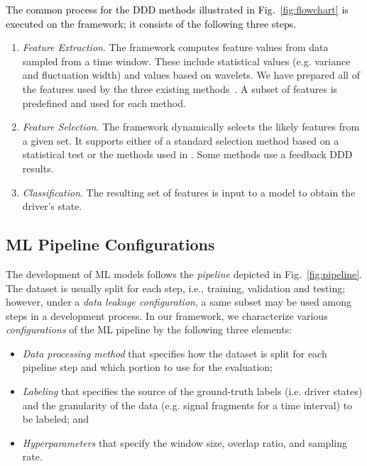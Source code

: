 \documentclass[letterpaper, 10 pt, conference]{ieeeconf}  %
\newcommand{\Ishii}[1]{\textcolor{black}{#1}}
\begin{document}
\Ishii{The common process for the DDD methods illustrated in Fig.~\ref{fig:flowchart} is executed on the framework; it consists of the following three steps.}
\begin{enumerate}
    \item \emph{Feature Extraction}. 
    The framework computes feature values from data sampled from a time window. These include statistical values (e.g. variance and fluctuation width) and values based on wavelets. We have prepared all of the features used by the three existing methods~\cite{Zhao2009, Arefnezhad2019, Wang2022}.
    A subset of features is predefined and used for each method.
    \item \emph{Feature Selection}. 
    The framework dynamically selects the likely features from a given set.
    It supports either of a standard selection method based on a statistical test or the methods used in \cite{Arefnezhad2019, Wang2022}.
    Some methods use a feedback DDD results.
    \item \emph{Classification}. The resulting set of features is input to a model to obtain the driver's state.
\end{enumerate}

\subsection{ML Pipeline Configurations}
\label{sec:conf}

The development of ML models follows the \emph{pipeline} depicted in Fig.~\ref{fig:pipeline}.
The dataset is usually split for each step, i.e., training, validation and testing; however, under a \emph{data leakage configuration}, a same subset may be used among steps in a development process.
%
In our framework, we characterize various \emph{configurations} of the ML pipeline by the following three elements:
\begin{itemize}
\item \emph{Data processing method} that specifies how the dataset is split for each pipeline step and which portion to use for the evaluation;
\item \emph{Labeling} that specifies the source of the ground-truth labels (i.e. driver states) and the granularity of the data (e.g. signal fragments for a time interval) to be labeled; and
\item \emph{Hyperparameters} that specify the window size, overlap ratio, and sampling rate.
\end{itemize}
\end{document}
